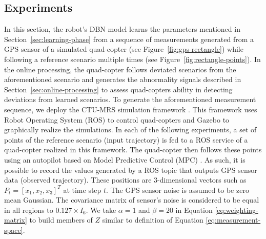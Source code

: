 \documentclass{article}
\begin{document}
\begin{multicols}{2}
\section{Experiments}\label{sec:experiments}
    In this section, the robot's DBN model learns the parameters mentioned in Section~\ref{sec:learning-phase} from a sequence of measurements generated from a GPS sensor of a simulated quad-copter (see Figure~\ref{fig:gps-rectangle}) while following a  reference scenario multiple times (see Figure~\ref{fig:rectangle-points}). In the online processing, the quad-copter follows deviated scenarios from the aforementioned scenario and generates the abnormality signals described in Section~\ref{sec:online-processing} to assess quad-copters ability in detecting deviations from learned scenarios. To generate the aforementioned measurement sequence, we deploy the CTU-MRS simulation framework \cite{baca-2020-the-mrs-uav-system-pushing-the-frontiers-of-reproducible-research-real-world-deployment-and-education-with-autonomous-unmanned-aerial-vehicles}. This framework uses Robot Operating System (ROS) \cite{quigley-2009-ros-an-open-source-robot-operating-system} to control quad-copters and Gazebo \cite{koenig-2004-design-and-use-paradigms-for-gazebo-an-open-source-multi-robot-simulator} to graphically realize the simulations. In each of the following experiments, a set of points of the reference scenario (input trajectory) is fed to a ROS service of a quad-copter realized in this framework. The quad-copter then follows these points using an autopilot based on Model Predictive Control (MPC) \cite{garcia-1989-model-predictive-control-theory-and-practice-a-survey}. As such, it is possible to record the values generated by a ROS topic that outputs GPS sensor data (observed trajectory).  These positions are 3-dimensional vectors such as $P_t=[x_{1},x_{2},x_{3}]^T$ at time step $t$. The GPS sensor noise is assumed to be zero mean Gaussian. The covariance matrix of sensor's noise is considered to be equal in all regions to $0.127\times I_6$. We take $\alpha = 1$ and $\beta=20$ in Equation \ref{eq:weighting-matrix} to build members of $Z$ similar to definition of Equation \ref{eq:measurement-space}. 
    

\end{multicols}
\end{document}

